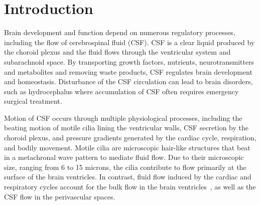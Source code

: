 \documentclass{WileyMSP-template}
\begin{document}






\section{Introduction}
Brain development and function depend on numerous regulatory processes,
including the flow of cerebrospinal fluid
(CSF). CSF is a clear liquid produced by the choroid plexus
and the fluid flows through the ventricular system and subarachnoid space.
By transporting growth factors, nutrients, neurotransmitters and metabolites
and removing waste products, CSF regulates brain development and homeostasis.
Disturbance of the CSF circulation can lead to brain disorders, such as
hydrocephalus where accumulation of CSF often requires emergency surgical treatment. 

Motion of CSF occurs through multiple physiological processes,
including the beating motion of motile cilia lining the ventricular walls,
CSF secretion by the choroid plexus, and pressure gradients generated
by the cardiac cycle, respiration, and bodily movement. Motile cilia
are microscopic hair-like structures that beat in a metachronal wave
pattern to mediate fluid flow. Due to their microscopic size, ranging
from 6 to 15 microns, the cilia contribute to flow primarily at the surface
of the brain ventricles. In contrast, fluid flow induced by the 
cardiac and respiratory cycles account for the bulk flow in the brain
ventricles~\cite{Vinje2019RespiratoryMeasurements},
as well as the CSF flow in the perivascular spaces.
\end{document}
